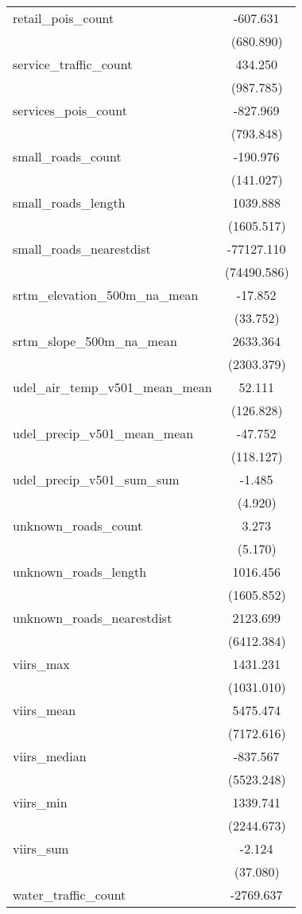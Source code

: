 \begin{table}[!htbp]
\begin{tabular}{@{\extracolsep{5pt}}lc}
 retail_pois_count & -607.631$^{}$ \\
  & (680.890) \\
 service_traffic_count & 434.250$^{}$ \\
  & (987.785) \\
 services_pois_count & -827.969$^{}$ \\
  & (793.848) \\
 small_roads_count & -190.976$^{}$ \\
  & (141.027) \\
 small_roads_length & 1039.888$^{}$ \\
  & (1605.517) \\
 small_roads_nearestdist & -77127.110$^{}$ \\
  & (74490.586) \\
 srtm_elevation_500m_na_mean & -17.852$^{}$ \\
  & (33.752) \\
 srtm_slope_500m_na_mean & 2633.364$^{}$ \\
  & (2303.379) \\
 udel_air_temp_v501_mean_mean & 52.111$^{}$ \\
  & (126.828) \\
 udel_precip_v501_mean_mean & -47.752$^{}$ \\
  & (118.127) \\
 udel_precip_v501_sum_sum & -1.485$^{}$ \\
  & (4.920) \\
 unknown_roads_count & 3.273$^{}$ \\
  & (5.170) \\
 unknown_roads_length & 1016.456$^{}$ \\
  & (1605.852) \\
 unknown_roads_nearestdist & 2123.699$^{}$ \\
  & (6412.384) \\
 viirs_max & 1431.231$^{}$ \\
  & (1031.010) \\
 viirs_mean & 5475.474$^{}$ \\
  & (7172.616) \\
 viirs_median & -837.567$^{}$ \\
  & (5523.248) \\
 viirs_min & 1339.741$^{}$ \\
  & (2244.673) \\
 viirs_sum & -2.124$^{}$ \\
  & (37.080) \\
 water_traffic_count & -2769.637$^{}$ \\

\end{tabular}
\end{table}
